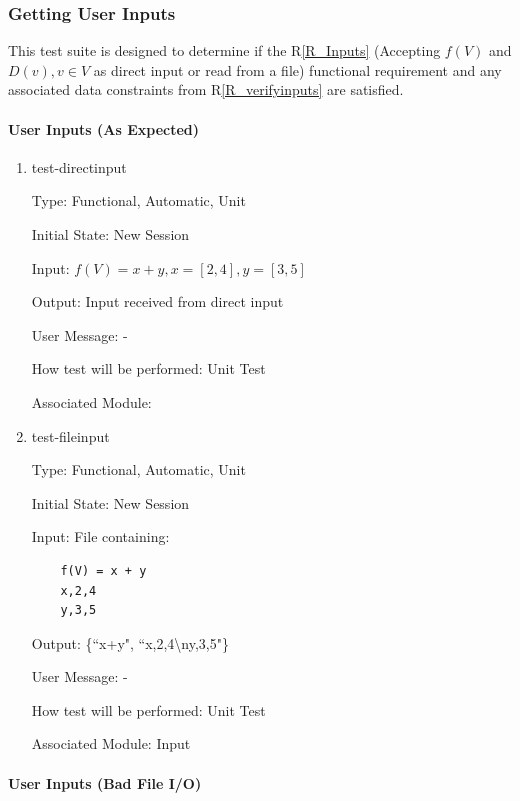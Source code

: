 \documentclass[12pt, titlepage]{article}
\newcommand{\rref}[1]{R\ref{#1}}
\begin{document}
\subsubsection{Getting User Inputs}
\label{tests_gettingInputs}
This test suite is designed to determine if the \rref{R_Inputs} (Accepting 
$f(V)$ and $D(v), v \in V$ as direct input or read from a file) functional 
requirement and any associated data constraints from 
\rref{R_verifyinputs} are satisfied.

\paragraph{User Inputs (As Expected)}

\begin{enumerate}
	
	\item{test-directinput}
	
	Type: Functional, Automatic, Unit
	
	Initial State: New Session
	
	Input: $f(V) = x + y, x = [2,4], y = [3,5]$
	
	Output: Input received from direct input
	
	User Message: - 
	
	How test will be performed: Unit Test
	
	Associated Module: \\
	
	\item{test-fileinput}

	Type: Functional, Automatic, Unit
	
	Initial State: New Session
	
	Input: File containing:
	\begin{lstlisting}
	f(V) = x + y
	x,2,4
	y,3,5
	\end{lstlisting}
	
	Output: \{``x+y", ``x,2,4\textbackslash ny,3,5"\}
	
	User Message: - 
	
	How test will be performed: Unit Test
	
	Associated Module: Input\\
\end{enumerate}
	
\paragraph{User Inputs (Bad File I/O)}
\end{document}
